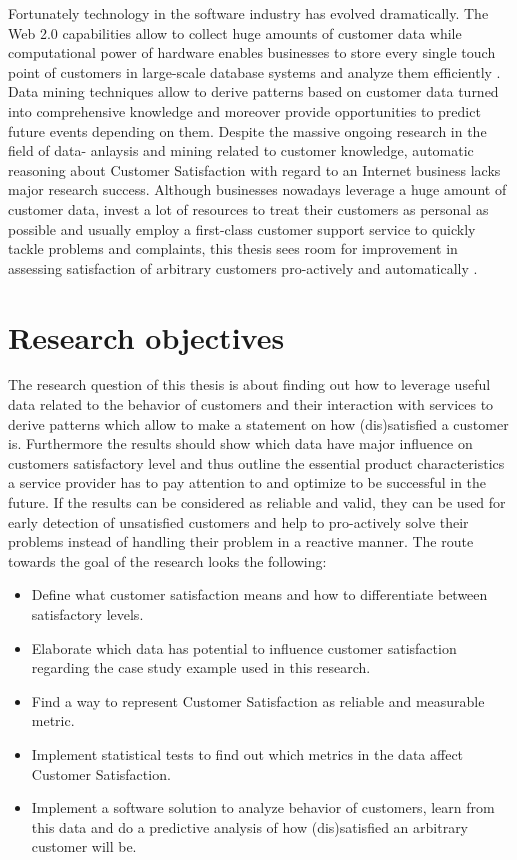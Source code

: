 Fortunately technology in the software industry has evolved dramatically. The Web 2.0 capabilities allow to collect huge amounts of customer data while computational power of hardware enables businesses to store every single touch point of customers in large-scale database systems and analyze them efficiently \cite{chen2003understanding} \cite{neckel2015}. Data mining techniques allow to derive patterns based on customer data turned into comprehensive knowledge and moreover provide opportunities to predict future events depending on them. Despite the massive ongoing research in the field of data- anlaysis and mining related to customer knowledge, automatic reasoning about Customer Satisfaction with regard to an Internet business lacks major research success. Although businesses nowadays leverage a huge amount of customer data, invest a lot of resources to treat their customers as personal as possible and usually employ a first-class customer support service to quickly tackle problems and complaints, this thesis sees room for improvement in assessing satisfaction of arbitrary customers pro-actively and automatically \cite{neckel2015}.

\section{Research objectives}
The research question of this thesis is about finding out how to leverage useful data related to the behavior of customers and their interaction with services to derive patterns which allow to make a statement on how (dis)satisfied a customer is. Furthermore the results should show which data have major influence on customers satisfactory level and thus outline the essential product characteristics a service provider has to pay attention to and optimize to be successful in the future. If the results can be considered as reliable and valid, they can be used for early detection of unsatisfied customers and help to pro-actively solve their problems instead of handling their problem in a reactive manner.
The route towards the goal of the research looks the following:

\begin{itemize}
	\item Define what customer satisfaction means and how to differentiate between satisfactory levels.
	\item Elaborate which data has potential to influence customer satisfaction regarding the case study example used in this research. 
	\item Find a way to represent Customer Satisfaction as reliable and measurable metric.
	\item Implement statistical tests to find out which metrics in the data affect Customer Satisfaction. 
	\item Implement a software solution to analyze behavior of customers, learn from this data and do a predictive analysis of how (dis)satisfied an arbitrary customer will be.
\end{itemize}

